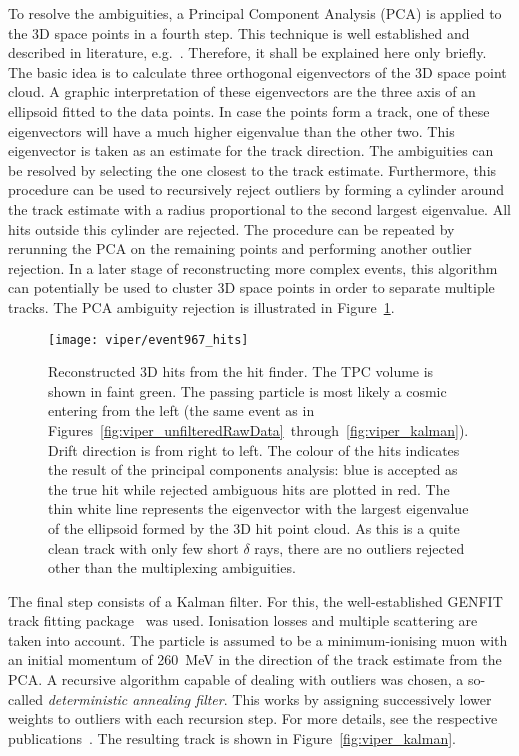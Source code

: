 To resolve the ambiguities, a Principal Component Analysis (PCA) is applied to the 3D space points in a fourth step.
This technique is well established and described in literature, e.g.~\cite{pca}.
Therefore, it shall be explained here only briefly.
The basic idea is to calculate three orthogonal eigenvectors of the 3D space point cloud.
A graphic interpretation of these eigenvectors are the three axis of an ellipsoid fitted to the data points.
In case the points form a track, one of these eigenvectors will have a much higher eigenvalue than the other two.
This eigenvector is taken as an estimate for the track direction.
The ambiguities can be resolved by selecting the one closest to the track estimate.
Furthermore, this procedure can be used to recursively reject outliers by forming a cylinder around the track estimate with a radius proportional to the second largest eigenvalue.
All hits outside this cylinder are rejected.
The procedure can be repeated by rerunning the PCA on the remaining points and performing another outlier rejection.
In a later stage of reconstructing more complex events, this algorithm can potentially be used to cluster 3D space points in order to separate multiple tracks.
The PCA ambiguity rejection is illustrated in Figure~\ref{fig:viper_pca}.

\begin{figure}[htb]
	\centering
	\texttt{[image: viper/event967\_hits]}
	\caption{Reconstructed 3D hits from the hit finder.
	The TPC volume is shown in faint green.
	The passing particle is most likely a cosmic \Pgm entering from the left (the same event as in Figures~\ref{fig:viper_unfilteredRawData}~through~\ref{fig:viper_kalman}).
	Drift direction is from right to left.
	The colour of the hits indicates the result of the principal components analysis: blue is accepted as the true hit while rejected ambiguous hits are plotted in red.
	The thin white line represents the eigenvector with the largest eigenvalue of the ellipsoid formed by the 3D hit point cloud.
	As this is a quite clean track with only few short $\delta$ rays, there are no outliers rejected other than the multiplexing ambiguities.}
	\label{fig:viper_pca}
\end{figure}

The final step consists of a Kalman filter.
For this, the well-established GENFIT track fitting package~\cite{genfit1, genfit2} was used.
Ionisation losses and multiple scattering are taken into account.
The particle is assumed to be a minimum-ionising muon with an initial momentum of \SI{260}{\mega\electronvolt} in the direction of the track estimate from the PCA.
A recursive algorithm capable of dealing with outliers was chosen, a so-called \emph{deterministic annealing filter}.
This works by assigning successively lower weights to outliers with each recursion step.
For more details, see the respective publications~\cite{genfit1, genfit2}.
The resulting track is shown in Figure~\ref{fig:viper_kalman}.

